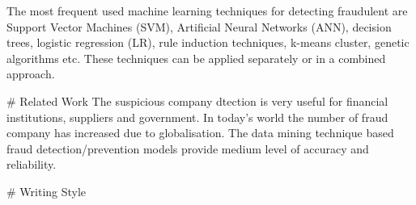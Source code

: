 The most frequent used machine learning techniques for detecting fraudulent are Support Vector Machines (SVM), Artificial Neural Networks (ANN), decision trees, logistic regression (LR), rule induction techniques, k-means cluster, genetic algorithms etc. These techniques can be applied separately or in a combined approach. 

# Related Work 
The suspicious company dtection is very useful for financial institutions, suppliers and government. In today's world the number of fraud company has increased due to globalisation. The data mining technique based fraud detection/prevention models provide medium level of accuracy and reliability.


# Writing Style
































